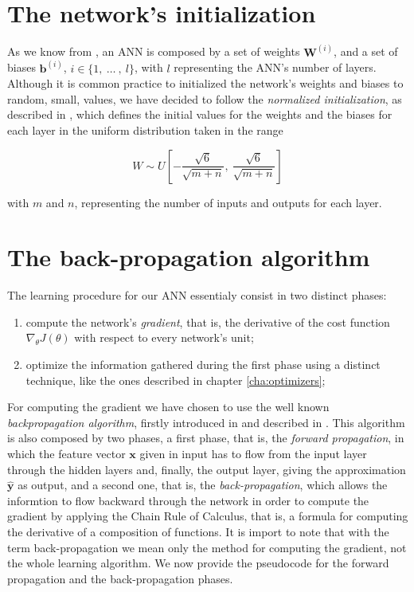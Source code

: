 	\section{The network's initialization} %
	\label{sec:the_network_s_initialization}
		As we know from \cite{Goodfellow-et-al-2016,haykin2009neural,mitchell1997machine}, an ANN is composed by
		a set of weights $\mathbf{W}^{(i)}$, and a set of biases $\mathbf{b}^{(i)}$,
		$i \in \{ 1, \ \ldots \ , \ l \}$, with $l$ representing the ANN's number of layers. Although it is common
		practice to initialized the network's weights and biases to random, small, values, we have decided to
		follow the \textit{normalized initialization}, as described in \cite{Glorot10understandingthe}, which
		defines the initial values for the weights and the biases for each layer in the uniform distribution
		taken in the range

		\begin{equation*}
		    W \sim U \left [ -\frac{\sqrt{6}}{\sqrt{m + n}}, \ \frac{\sqrt{6}}{\sqrt{m + n}} \right ]
		\end{equation*}

		with $m$ and $n$, representing the number of inputs and outputs for each layer.

	\section{The back-propagation algorithm} %
	\label{sec:the_back-propagation_algorithm}
		The learning procedure for our ANN essentialy consist in two distinct phases:

		\begin{enumerate}
			\item compute the network's \textit{gradient}, that is, the derivative of the cost function
			$\nabla_{\theta} J(\theta)$ with respect to every network's unit;
			\item optimize the information gathered during the first phase using a distinct technique, like the
			ones described in chapter \ref{cha:optimizers};
		\end{enumerate}

		For computing the gradient we have chosen to use
		the well known \textit{backpropagation algorithm}, firstly introduced in \cite{10028086174} and described
		in \cite{Goodfellow-et-al-2016,haykin2009neural,mitchell1997machine}. This algorithm is
		also composed by two phases, a first phase, that is, the \textit{forward propagation}, in which the
		feature vector $\mathbf{x}$ given in input has to flow from the input layer through the hidden layers and,
		finally, the output layer, giving the approximation $\hat{\mathbf{y}}$ as output, and a second one, that
		is, the \textit{back-propagation}, which allows the informtion to flow backward through the network in
		order to compute the gradient by applying the Chain Rule of Calculus, that is, a formula for computing the
		derivative of a composition of functions. It is import to note that with the term back-propagation we mean
		only the method for computing the gradient, not the whole learning algorithm. We now provide the
		pseudocode for the forward propagation and the back-propagation phases.

